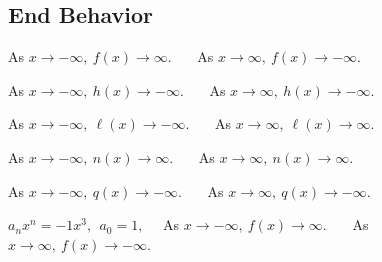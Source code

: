\documentclass[12pt]{book}
\theoremstyle{definition}
\newcommand{\Desmos}{\href{https://www.desmos.com/}{Desmos}}
\begin{document}
\subsection*{End Behavior}
\begin{oddenumerate}
\item %
As $x\rightarrow -\infty, \ f(x)\rightarrow \infty$. \ \ \ As $x\rightarrow\infty, \ f(x)\rightarrow -\infty$.
\item %
As $x\rightarrow -\infty, \ h(x)\rightarrow -\infty$. \ \ \ As $x\rightarrow\infty, \ h(x)\rightarrow -\infty$.
\item %
As $x\rightarrow -\infty, \ \ell(x)\rightarrow -\infty$. \ \ \ As $x\rightarrow\infty, \ \ell(x)\rightarrow \infty$.
\item %
As $x\rightarrow -\infty, \ n(x)\rightarrow \infty$. \ \ \ As $x\rightarrow\infty, \ n(x)\rightarrow \infty$.
\item %
As $x\rightarrow -\infty, \ q(x)\rightarrow -\infty$. \ \ \ As $x\rightarrow\infty, \ q(x)\rightarrow -\infty$.
	\item %
$a_nx^n=-1x^3, \ \ a_0=1,$ \ \ As $x\rightarrow -\infty, \ f(x)\rightarrow \infty$. \ \ \ As $x\rightarrow\infty, \ f(x)\rightarrow -\infty$.
	\item %

\end{oddenumerate}
\end{document}
